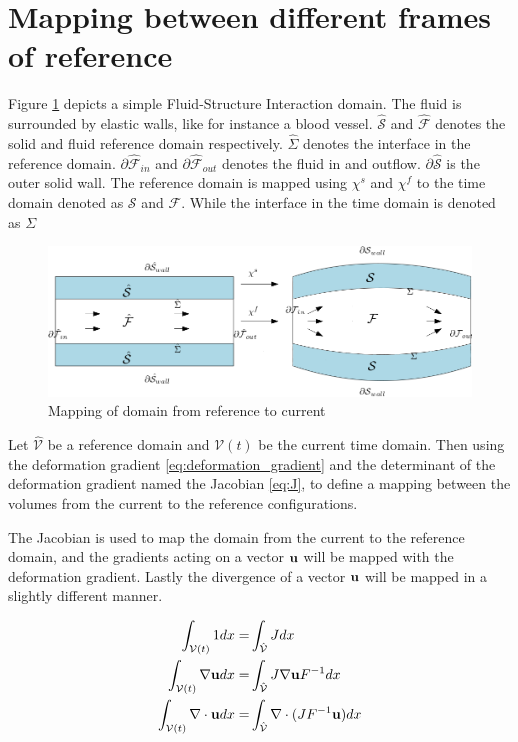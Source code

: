 \section{Mapping between different frames of reference}
Figure \ref{pic:FSI_mapping} depicts a simple Fluid-Structure Interaction domain. The fluid is surrounded by elastic walls, like for instance a blood vessel. 
$\hat{\mathcal{S}}$ and $\hat{\mathcal{F}}$ denotes the solid and fluid reference domain respectively. $\hat{\Sigma}$ denotes the interface in the reference domain. $\partial\hat{\mathcal{F}}_{in}$ and $\partial\hat{\mathcal{F}}_{out}$ denotes the fluid in and outflow. $\partial \hat{\mathcal{S}}$ is the outer solid wall. The reference domain is mapped using $\chi^s$ and $\chi^f$ to the time domain denoted as $\mathcal{S}$ and $\mathcal{F}$. While the interface in the time domain is denoted as $\Sigma$

\begin{figure}[H]
\label{pic:FSI_mapping}
\includegraphics[scale=0.45]{./FSI_ALE_formulation/FSI_mapping.png}
\caption{Mapping of domain from reference to current}
\end{figure}

Let $\hat{\mathcal{V}}$ be a reference domain and $\mathcal{V}(t)$ be the current time domain. Then using the deformation gradient \eqref{eq:deformation_gradient} and the determinant of the deformation gradient named the Jacobian \eqref{eq:J}, to define a mapping between the volumes from the current to the reference configurations.

The Jacobian is used to map the domain from the current to the reference domain, and the gradients acting on a vector $ \bold{u} $ will be mapped with the deformation gradient. Lastly the divergence of a vector $ \bold{u}$ will be mapped in a slightly different manner.

\begin{align}
\int_{\mathcal{V}(t)} 1  dx =& \int_{\hat{\mathcal{V}}} J dx  \label{eq:mappings1}\\
\int_{\mathcal{V}(t)} \nabla \bold{u}   dx =& \int_{\hat{\mathcal{V}}} J  \nabla \bold{u}F^{-1} dx \label{eq:mappings2} \\
\int_{\mathcal{V}(t)} \nabla \cdot \bold{u}   dx =& \int_{\hat{\mathcal{V}}} \nabla \cdot( J  F^{-1} \bold{u}) dx  \label{eq:mappings3}
\end{align}

